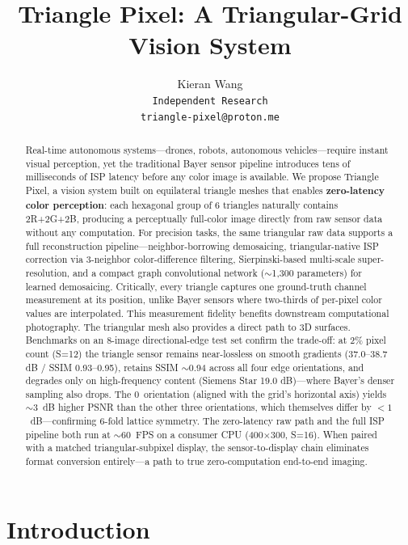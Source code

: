\documentclass[10pt,twocolumn,letterpaper]{article}
\title{\Large \bf Triangle Pixel: A Triangular-Grid Vision System}
\author{
Kieran Wang\\
\texttt{Independent Research}\\
\small\texttt{triangle-pixel@proton.me}
}
\date{}
\begin{document}
\maketitle

\begin{abstract}
Real-time autonomous systems---drones, robots, autonomous vehicles---require instant visual perception, yet the traditional Bayer sensor pipeline introduces tens of milliseconds of ISP latency before any color image is available. We propose Triangle Pixel, a vision system built on equilateral triangle meshes that enables \textbf{zero-latency color perception}: each hexagonal group of 6 triangles naturally contains 2R+2G+2B, producing a perceptually full-color image directly from raw sensor data without any computation. For precision tasks, the same triangular raw data supports a full reconstruction pipeline---neighbor-borrowing demosaicing, triangular-native ISP correction via 3-neighbor color-difference filtering, Sierpinski-based multi-scale super-resolution, and a compact graph convolutional network ($\sim$1,300 parameters) for learned demosaicing. Critically, every triangle captures one ground-truth channel measurement at its position, unlike Bayer sensors where two-thirds of per-pixel color values are interpolated. This measurement fidelity benefits downstream computational photography. The triangular mesh also provides a direct path to 3D surfaces. Benchmarks on an 8-image directional-edge test set confirm the trade-off: at 2\% pixel count (S=12) the triangle sensor remains near-lossless on smooth gradients (37.0--38.7 dB / SSIM 0.93--0.95), retains SSIM $\sim$0.94 across all four edge orientations, and degrades only on high-frequency content (Siemens Star 19.0 dB)---where Bayer's denser sampling also drops. The 0\textdegree\ orientation (aligned with the grid's horizontal axis) yields $\sim$3~dB higher PSNR than the other three orientations, which themselves differ by $<1$~dB---confirming 6-fold lattice symmetry. The zero-latency raw path and the full ISP pipeline both run at $\sim$60~FPS on a consumer CPU (400$\times$300, S=16). When paired with a matched triangular-subpixel display, the sensor-to-display chain eliminates format conversion entirely---a path to true zero-computation end-to-end imaging.
\end{abstract}

\section{Introduction}
\end{document}
